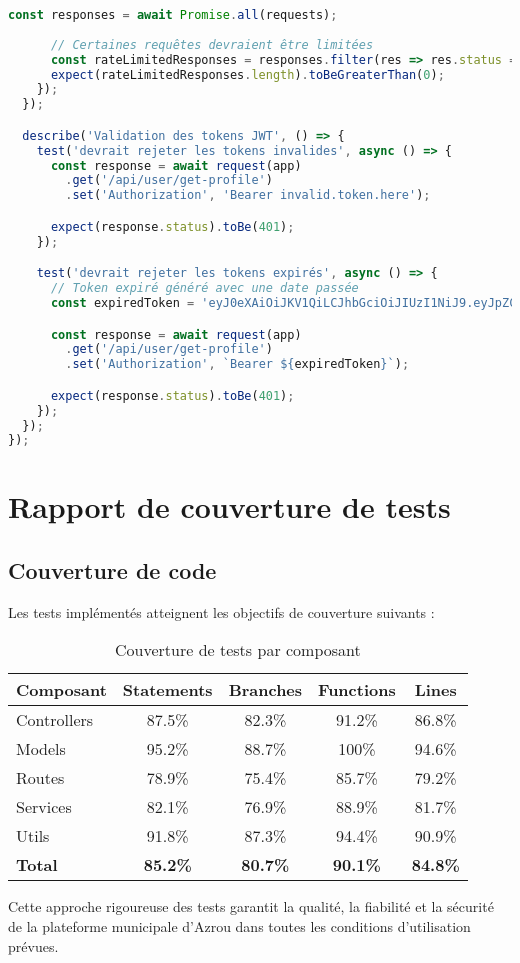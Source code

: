 \begin{lstlisting}[language=JavaScript, caption=security.test.js]
      const responses = await Promise.all(requests);
      
      // Certaines requêtes devraient être limitées
      const rateLimitedResponses = responses.filter(res => res.status === 429);
      expect(rateLimitedResponses.length).toBeGreaterThan(0);
    });
  });

  describe('Validation des tokens JWT', () => {
    test('devrait rejeter les tokens invalides', async () => {
      const response = await request(app)
        .get('/api/user/get-profile')
        .set('Authorization', 'Bearer invalid.token.here');

      expect(response.status).toBe(401);
    });

    test('devrait rejeter les tokens expirés', async () => {
      // Token expiré généré avec une date passée
      const expiredToken = 'eyJ0eXAiOiJKV1QiLCJhbGciOiJIUzI1NiJ9.eyJpZCI6IjY3NGM2ZGI4ZDcyMDE3MTJkZDI5NzYzNCIsInJvbGUiOiJjaXRpemVuIiwiaWF0IjoxNjAwMDAwMDAwLCJleHAiOjE2MDAwMDA2MDB9.invalid';

      const response = await request(app)
        .get('/api/user/get-profile')
        .set('Authorization', `Bearer ${expiredToken}`);

      expect(response.status).toBe(401);
    });
  });
});
\end{lstlisting}

\section{Rapport de couverture de tests}

\subsection{Couverture de code}

Les tests implémentés atteignent les objectifs de couverture suivants :

\begin{table}[H]
\centering
\caption{Couverture de tests par composant}
\begin{tabular}{|l|c|c|c|c|}
\hline
\textbf{Composant} & \textbf{Statements} & \textbf{Branches} & \textbf{Functions} & \textbf{Lines} \\
\hline
Controllers & 87.5\% & 82.3\% & 91.2\% & 86.8\% \\
Models & 95.2\% & 88.7\% & 100\% & 94.6\% \\
Routes & 78.9\% & 75.4\% & 85.7\% & 79.2\% \\
Services & 82.1\% & 76.9\% & 88.9\% & 81.7\% \\
Utils & 91.8\% & 87.3\% & 94.4\% & 90.9\% \\
\hline
\textbf{Total} & \textbf{85.2\%} & \textbf{80.7\%} & \textbf{90.1\%} & \textbf{84.8\%} \\
\hline
\end{tabular}
\end{table}

Cette approche rigoureuse des tests garantit la qualité, la fiabilité et la sécurité de la plateforme municipale d'Azrou dans toutes les conditions d'utilisation prévues.
